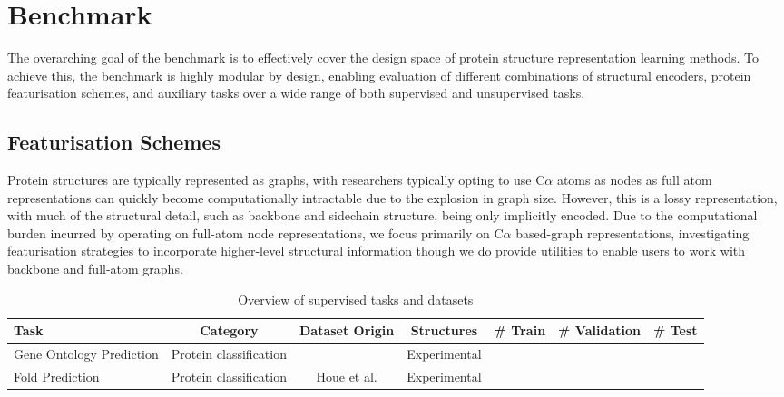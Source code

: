 \section{Benchmark}
The overarching goal of the benchmark is to effectively cover the design space of protein structure representation learning methods. To achieve this, the benchmark is highly modular by design, enabling evaluation of different combinations of structural encoders, protein featurisation schemes, and auxiliary tasks over a wide range of both supervised and unsupervised tasks.

\subsection{Featurisation Schemes}
Protein structures are typically represented as graphs, with researchers typically opting to use C$\alpha$ atoms as nodes as full atom representations can quickly become computationally intractable due to the explosion in graph size. However, this is a lossy representation, with much of the structural detail, such as backbone and sidechain structure, being only implicitly encoded. Due to the computational burden incurred by operating on full-atom node representations, we focus primarily on C$\alpha$ based-graph representations, investigating featurisation strategies to incorporate higher-level structural information though we do provide utilities to enable users to work with backbone and full-atom graphs.



\begin{table*}[!ht]
    \centering
    \caption{Overview of supervised tasks and datasets}
    \begin{adjustbox}{max width=\linewidth}
        \begin{tabular}{lcccccc}
        \toprule
        \textbf{Task} & \textbf{Category} & \textbf{Dataset Origin} & \textbf{Structures} &  \textbf{\# Train} & \textbf{\# Validation} & \textbf{\# Test} \\
        \hline
        Gene Ontology Prediction & Protein classification & \citet{Gligorijevi2021} & Experimental \\
        Fold Prediction & Protein classification & Houe et al. & Experimental
        \end{tabular}
    \end{adjustbox}
    \vspace{-1em}
\end{table*}

